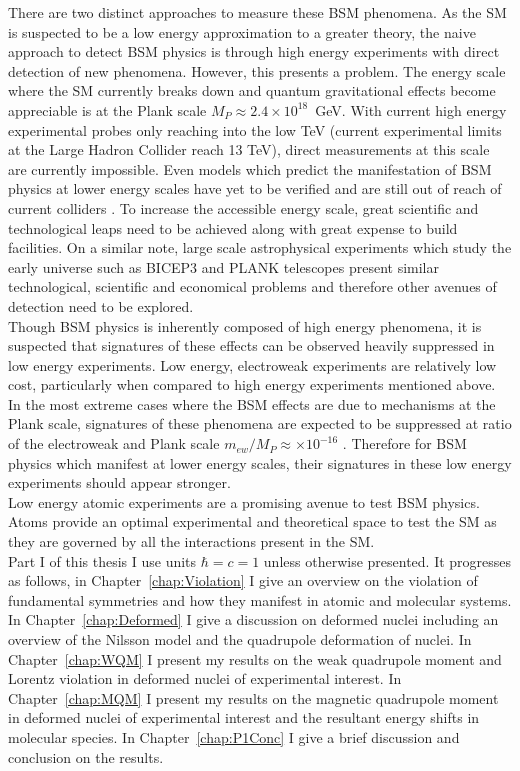 \documentclass[10pt,a4paper, twoside, openright]{report}
\begin{document}
\linebreak
There are two distinct approaches to measure these BSM phenomena. As the SM is suspected to be a low energy approximation to a greater theory, the naive approach to detect BSM physics is through high energy experiments with direct detection of new phenomena. However, this presents a problem. The energy scale where the SM currently breaks down and quantum gravitational effects become appreciable is at the Plank scale $M_P \approx 2.4 \times 10^{18}$~GeV. With current high energy experimental probes only reaching into the low TeV (current experimental limits at the Large Hadron Collider reach 13 TeV), direct measurements at this scale are currently impossible. Even models which predict the manifestation of BSM physics at lower energy scales have yet to be verified and are still out of reach of current colliders \cite{Bechtle2015}. To increase the accessible energy scale, great scientific and technological leaps need to be achieved along with great expense to build facilities. On a similar note, large scale astrophysical experiments which study the early universe such as BICEP3\cite{BICEP3} and PLANK\cite{PLANK2016} telescopes present similar technological, scientific and economical problems and therefore other avenues of detection need to be explored. \\
\linebreak
Though BSM physics is inherently composed of high energy phenomena, it is suspected that signatures of these effects can be observed heavily suppressed in low energy experiments. Low energy,  electroweak experiments are relatively low cost, particularly when compared to high energy experiments mentioned above. In the most extreme cases where the BSM effects are due to mechanisms at the Plank scale, signatures of these phenomena are  expected to be suppressed at ratio of the electroweak and Plank scale $m_{ew}/M_P \approx \times 10^{-16}$  \cite{Kostelecky1995}. Therefore for BSM physics which manifest at lower energy scales, their signatures in these low energy experiments should appear stronger. \\
\linebreak
Low energy atomic experiments are a promising avenue to test BSM physics. Atoms provide an optimal experimental and theoretical space to test the SM as they are governed by all the interactions present in the SM. \\
\linebreak
Part I of this thesis I use units $\hbar=c=1$ unless otherwise presented. It progresses as follows, in Chapter~\ref{chap:Violation} I give an overview on the violation of fundamental symmetries and how  they manifest in atomic and molecular systems. In Chapter~\ref{chap:Deformed} I give a discussion on deformed nuclei including an overview of the Nilsson model and the quadrupole deformation of nuclei. In Chapter~\ref{chap:WQM} I present my results on the weak quadrupole moment and Lorentz violation in deformed nuclei of experimental interest. In Chapter~\ref{chap:MQM} I present my results on the magnetic quadrupole moment in deformed nuclei of experimental interest and the resultant energy shifts in molecular species. In Chapter~\ref{chap:P1Conc} I give a brief discussion and conclusion on the results. \\
\end{document}
